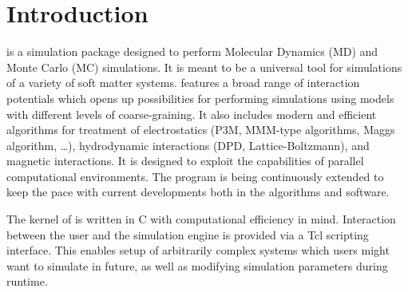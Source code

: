 %  
%   
%  
%  
%
\chapter{Introduction}
\label{chap:intro}

\es is a simulation package designed to perform Molecular Dynamics (MD)
and Monte Carlo (MC) simulations.  It is meant to be a universal tool for 
simulations of a variety of soft matter systems. 
\es features a broad range of interaction potentials which opens up
possibilities for performing simulations using models with 
different levels of coarse-graining. It also includes modern and
efficient algorithms for treatment of electrostatics (P3M, MMM-type 
algorithms, Maggs algorithm, \ldots), hydrodynamic interactions
(DPD, Lattice-Boltzmann), and magnetic interactions. It is 
designed to exploit the capabilities of parallel computational
environments. The program is being continuously extended to keep
the pace with current developments both in the algorithms and software.

The kernel of \es is written in C with computational efficiency in mind.
Interaction between the user and the simulation engine is provided
via a Tcl scripting interface. This enables setup of arbitrarily
complex systems which users might want to simulate in future, 
as well as modifying simulation parameters during runtime.


